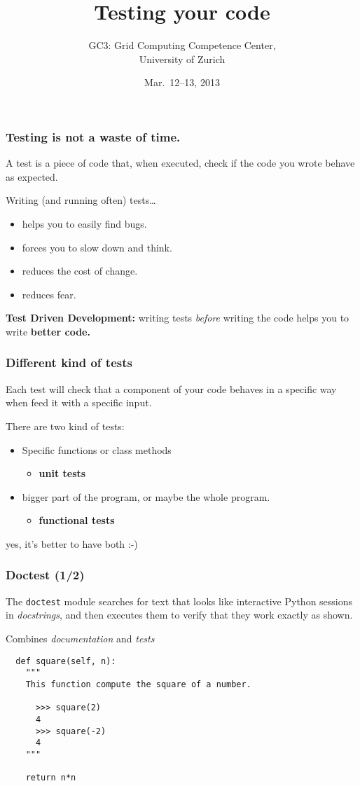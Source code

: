 \documentclass[english,serif,mathserif,xcolor=pdftex,dvipsnames,table]{beamer}
\title[Testing]{%
  Testing your code
}
\author[GC3]{%
  GC3: Grid Computing Competence Center, \\
  University of Zurich
}
\date{Mar.~12--13, 2013}
\begin{document}
\maketitle


\begin{frame}
  \frametitle{Testing is \textbf{not} a waste of time.}
  A test is a piece of code that, when executed, check if the code you
  wrote behave as expected.

  \+
  Writing (and running often) tests\ldots
  \begin{itemize}
  \item helps you to easily find bugs.
  \item forces you to slow down and think.
  \item reduces the cost of change.
  \item reduces fear.
  \end{itemize}

  \+ \textbf{Test Driven Development:} writing tests \textit{before}
  writing the code helps you to write \textbf{better code.}
\end{frame}


\begin{frame}
  \frametitle{Different kind of tests} 

  Each test will check that a component of your code behaves in a
  specific way when feed it with a specific input.

  \+
  There are two kind of tests:
  \begin{itemize}
  \item Specific functions or class methods
    \begin{itemize}
    \item \textbf{unit tests}
    \end{itemize}
  \item bigger part of the program, or maybe the whole program.
    \begin{itemize}
    \item \textbf{functional tests}
    \end{itemize}
  \end{itemize}

  \+
  \pause
  yes, it's better to have both :-)
\end{frame}


\begin{frame}[fragile]
  \frametitle{Doctest (1/2)}

  The \lstinline|doctest| module searches for text that looks like
  interactive Python sessions in \textit{docstrings}, and then
  executes them to verify that they work exactly as shown.

  \+
  Combines \textit{documentation} and \textit{tests}
  \begin{lstlisting}
  def square(self, n):
    """
    This function compute the square of a number.

      >>> square(2)
      4
      >>> square(-2)
      4
    """

    return n*n
  \end{lstlisting}
\end{frame}
\end{document}
